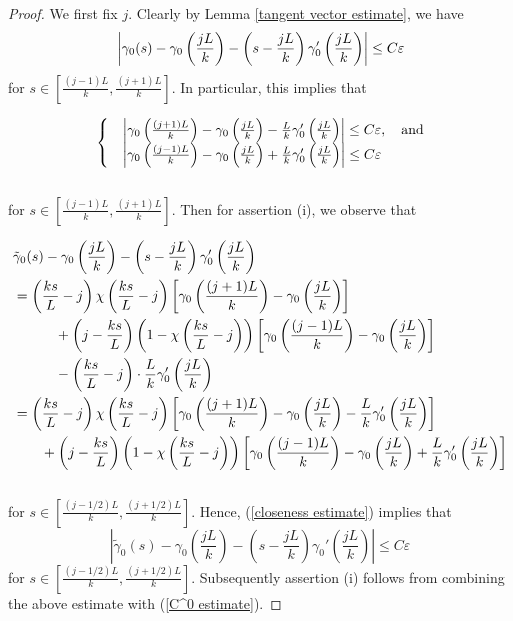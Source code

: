 \documentclass[a4paper, reqno]{amsart}
\theoremstyle{definition}
\theoremstyle{remark}
\numberwithin{equation}{section}
\numberwithin{equation}{section}
\numberwithin{equation}{section}
\begin{document}
\begin{proof}
We first fix $j$. Clearly by Lemma \ref{tangent vector estimate}, we have
\begin{equation}{\label{C^0 estimate}}
	\left| \gamma_0(s) - \gamma_0\left(\frac{jL}{k}\right) - \left(s - \frac{jL}{k}\right)\gamma_0'\left(\frac{jL}{k}\right) \right| \leq C\varepsilon 	
\end{equation}
for $s\in \left[\frac{(j-1)L}{k}, \frac{(j+1)L}{k} \right]$. 
In particular, this implies that

\begin{equation}{\label{closeness estimate}}
\begin{cases}
&\left| \gamma_0\left(\frac{(j+1)L}{k}\right) - \gamma_0\left(\frac{jL}{k}\right) -  \frac{L}{k}\gamma_0'\left(\frac{jL}{k}\right) \right| \leq C\varepsilon,\quad\text{and}\\
&\left| \gamma_0\left(\frac{(j-1)L}{k}\right) - \gamma_0\left(\frac{jL}{k}\right) +  \frac{L}{k}\gamma_0'\left(\frac{jL}{k}\right) \right| \leq C\varepsilon
\end{cases}
\end{equation}\\
for  $s\in \left[\frac{(j-1)L}{k}, \frac{(j+1)L}{k} \right]$. Then for assertion (i), we observe that

\begin{align*}
	&\tilde{\gamma}_0(s) - \gamma_0\left(\frac{jL}{k}\right) - \left(s - \frac{jL}{k}\right)\gamma_0'\left(\frac{jL}{k}\right) \\
	&=\left(\frac{ks}{L} - j\right)\chi\left(\frac{ks}{L} - j\right)\left[ \gamma_0\left(\frac{(j+1)L}{k}\right) - \gamma_0\left(\frac{jL}{k}\right)\right]\notag\\
	&\quad\quad\quad + \left( j - \frac{ks}{L} \right)\left( 1 -\chi\left(\frac{ks}{L} - j\right)\right)\left[ \gamma_0\left(\frac{(j-1)L}{k}\right) - \gamma_0\left(\frac{jL}{k}\right)\right]\\
	&\quad\quad\quad - \left(\frac{ks}{L} - j\right)\cdot\frac{L}{k}\gamma_0'\left(\frac{jL}{k}\right)\\
	&=\left(\frac{ks}{L} - j\right)\chi\left(\frac{ks}{L} - j\right)\left[ \gamma_0\left(\frac{(j+1)L}{k}\right) - \gamma_0\left(\frac{jL}{k}\right) - \frac{L}{k}\gamma_0'\left(\frac{jL}{k}\right)\right]\\
	&\quad\quad + \left( j - \frac{ks}{L} \right)\left( 1 -\chi\left(\frac{ks}{L} - j\right)\right)\left[ \gamma_0\left(\frac{(j-1)L}{k}\right) - \gamma_0\left(\frac{jL}{k}\right) + \frac{L}{k}\gamma_0'\left(\frac{jL}{k}\right)\right]
\end{align*}\\
for  $s\in \left[\frac{(j-1/2)L}{k}, \frac{(j+1/2)L}{k} \right]$. Hence, (\ref{closeness estimate}) implies that
\[ 	\left| \tilde{\gamma}_0(s) - \gamma_0\left(\frac{jL}{k}\right) - \left(s - \frac{jL}{k}\right)\gamma_0'\left(\frac{jL}{k}\right) \right| \leq C\varepsilon 	\] 
for  $s\in \left[\frac{(j-1/2)L}{k}, \frac{(j+1/2)L}{k} \right]$. Subsequently assertion (i) follows from combining the above estimate with (\ref{C^0 estimate}). 


\end{proof}
\end{document}
